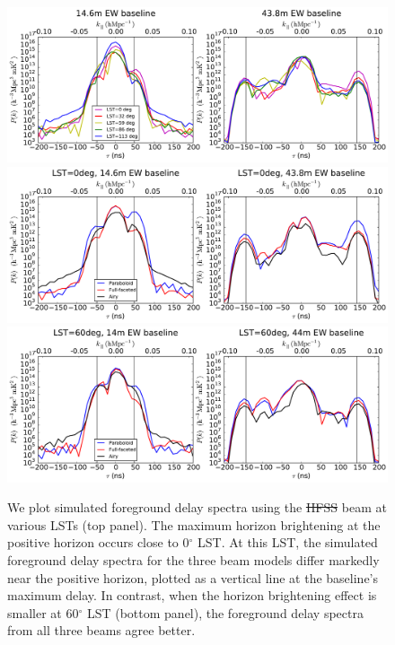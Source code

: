 \documentclass{emulateapj}
\providecommand{\DIFadd}[1]{{\protect\color{blue}\uwave{#1}}} %
\providecommand{\DIFdel}[1]{{\protect\color{red}\sout{#1}}}                      %
\providecommand{\DIFaddFL}[1]{\DIFadd{#1}} %
\providecommand{\DIFdelFL}[1]{\DIFdel{#1}} %
\providecommand{\DIFaddbeginFL}{} %
\providecommand{\DIFaddendFL}{} %
\providecommand{\DIFdelbeginFL}{} %
\providecommand{\DIFdelendFL}{} %
\begin{document}
\begin{figure}[h]
\centering
\includegraphics[width=6in]{nithya_fg_pspec_all_lst.pdf}
\includegraphics[width=6in]{nithya_fg_pspec_lst0deg.pdf}
\includegraphics[width=6in]{nithya_fg_pspec_lst60deg.pdf}
\caption{We plot simulated foreground delay spectra using the \DIFdelbeginFL \DIFdelFL{HFSS }\DIFdelendFL \DIFaddbeginFL \DIFaddFL{full-faceted }\DIFaddendFL beam at various LSTs (top panel). The maximum horizon brightening at the positive horizon occurs close to 0$^\circ$ LST. At this LST, the simulated foreground delay spectra for the three beam models differ markedly near the positive horizon, plotted as a vertical line at the baseline's maximum delay. In contrast, when the horizon brightening effect is smaller at 60$^\circ$ LST (bottom panel), the foreground delay spectra from all three beams agree better.}
\label{fig:delayspec}
\end{figure}
\end{document}
